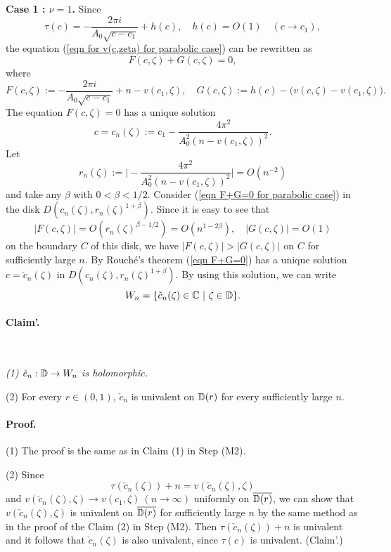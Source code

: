 \noin
{\bf Case 1 : $\nu = 1$. }
Since
$$
\tau(c)
=
-\frac{2\pi i}{A_0\sqrt{c - c_1}} + h(c), \quad h(c)=O(1) \quad (c \to c_1),
$$
the equation (\ref{eqn for v(c,zeta) for parabolic case}) 
can be rewritten as
\begin{equation}
F(c,\zeta) + G(c,\zeta) = 0,
\label{eqn F+G=0 for parabolic case}
\end{equation}
where
$$
  F(c,\zeta) :=  -\frac{2\pi i}{A_0\sqrt{c - c_1}} + n - v(c_1,\zeta), \quad
  G(c,\zeta) := h(c) - \big( v(c,\zeta)- v(c_1,\zeta) \big).
$$
The equation $F(c,\zeta)=0$ has a unique solution
$$
  c = c_n(\zeta) := c_1 -\frac{4\pi^2}{A_0^2(n - v(c_1,\zeta))^2}.
$$
Let
$$
  r_n(\zeta) := \bigg| -\frac{4\pi^2}{A_0^2(n - v(c_1,\zeta))^2} \bigg| 
= O(n^{-2})
$$
and take any $\beta$ with $0 < \beta < 1/2$. Consider 
(\ref{eqn F+G=0 for parabolic case}) in the disk 
$D(c_n(\zeta), r_n(\zeta)^{1+\beta})$. Since it is easy to see that
$$
  |F(c,\zeta)| = O(r_n(\zeta)^{\beta-1/2}) = O(n^{1-2\beta}), \quad 
  |G(c,\zeta)| = O(1)
$$
on the boundary $C$ of this disk, 
we have $|F(c,\zeta)| > |G(c,\zeta)|$ on $C$ for sufficiently large $n$. 
By Rouch\'e's theorem (\ref{eqn F+G=0}) has
a unique solution $c = \check{c}_n(\zeta)$ in $D(c_n(\zeta), r_n(\zeta)^{1+\beta})$.
By using this solution, we can write
$$
  W_n = \{ \check{c}_n(\zeta) \in \mathbb C \ | \ \zeta \in \mathbb D \}.
$$

\medskip

\paragraph{\bf Claim'.} \ 
{\it 
{\rm (1)} $\check{c}_n : \mathbb D \to W_n$ is holomorphic.

\noindent
{\rm (2)} For every $r \in (0,1)$, $\check{c}_n$ is univalent on $\mathbb D(r)$ for every
sufficiently large $n$.
}

\medskip


\paragraph{\bf Proof.}
(1) The proof is the same as in Claim (1) in Step (M2). 


\noindent
(2) Since
$$
  \tau(\check{c}_n(\zeta)) + n = v(\check{c}_n(\zeta), \zeta)
$$
and $v(\check{c}_n(\zeta), \zeta) \to v(c_1, \zeta) \ (n \to \infty)$
uniformly on $\overline{\mathbb D(r)}$, we can show that $v(\check{c}_n(\zeta), \zeta)$
is univalent on $\overline{\mathbb D(r)}$ for sufficiently large $n$ by the same method
as in the proof of the Claim (2) in Step (M2). Then
$\tau(\check{c}_n(\zeta)) + n$ is univalent and it follows that 
$\check{c}_n(\zeta)$ is also univalent, since $\tau(c)$ is univalent.
\QED (Claim'.)




